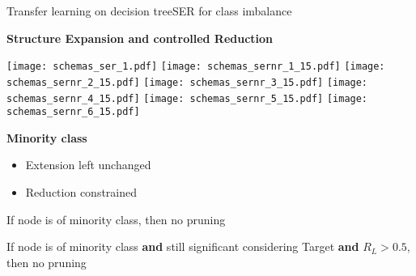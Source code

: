 \begin{frame}{Transfer learning on decision tree}{SER for class imbalance}
\begin{minipage}[t]{0.49\linewidth}
    \vspace{0pt}
    
    \centering
    \textbf{Structure Expansion and controlled Reduction}\\
        
    \renewcommand{\ratio}{0.8}
    \begin{overprint}
        \texttt{[image: schemas\_ser\_1.pdf]}
        \texttt{[image: schemas\_sernr\_1\_15.pdf]}
        \texttt{[image: schemas\_sernr\_2\_15.pdf]}
        \texttt{[image: schemas\_sernr\_3\_15.pdf]}
        \texttt{[image: schemas\_sernr\_4\_15.pdf]}
        \texttt{[image: schemas\_sernr\_5\_15.pdf]}
        \texttt{[image: schemas\_sernr\_6\_15.pdf]}
    \end{overprint}
    \pause
    \textcolor{mygreen}{\textbf{Minority class}}
\end{minipage}\hfill
\begin{minipage}[t]{0.49\linewidth}
    \vspace{0pt}
    \vspace{1.5cm}
    \begin{itemize}
    \pause \pause
    \item Extension left unchanged
    \pause
    \item Reduction constrained
    \end{itemize}
\begin{minipage}[t]{0.49\linewidth}
    \vspace{0pt}
    \begin{tcolorbox}[title=\serr,size=title,boxrule=0.2pt]
    If node is of minority class, then no pruning
    \end{tcolorbox}
\end{minipage}
\begin{minipage}[t]{0.49\linewidth}
    \vspace{0pt}
    \begin{tcolorbox}[title=\serll,size=title,boxrule=0.2pt]
    If node is of minority class \textbf{and} still significant considering Target \textbf{and} $R_L > 0.5$, then no pruning
    \end{tcolorbox}
\end{minipage}


    

\end{minipage}

\end{frame}

